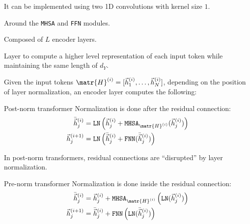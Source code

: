 \begin{description}
\begin{description}
                \begin{remark}
                    It can be implemented using two 1D convolutions with kernel size $1$.
                \end{remark}

            \item[Residual connection] 
                Around the \texttt{MHSA} and \texttt{FFN} modules.
        \end{description}


    \item[Encoder stack] 
        Composed of $L$ encoder layers.

    \item[Encoder layer] 
        Layer to compute a higher level representation of each input token while maintaining the same length of $d_Y$. 
        
        Given the input tokens $\matr{H}^{(i)} = [ \vec{h}^{(i)}_1, \dots, \vec{h}^{(i)}_N ]$, depending on the position of layer normalization, an encoder layer computes the following:
        \begin{descriptionlist}
            \item[Post-norm transformer] Normalization is done after the residual connection:
                \[
                    \begin{split}
                        \bar{\vec{h}}^{(i)}_j &= \texttt{LN}\left( \vec{h}^{(i)}_j + \texttt{MHSA}_{\matr{H}^{(i)}}(\vec{h}^{(i)}_j) \right) \\
                        \vec{h}^{(i+1)}_j &= \texttt{LN}\left( \bar{\vec{h}}^{(i)}_j + \texttt{FNN}(\bar{\vec{h}}^{(i)}_j) \right) \\
                    \end{split}
                \]

                \begin{remark}
                    In post-norm transformers, residual connections are ``disrupted'' by layer normalization.
                \end{remark}

            \item[Pre-norm transformer] Normalization is done inside the residual connection:
                \[
                    \begin{split}
                        \bar{\vec{h}}^{(i)}_j &= \vec{h}^{(i)}_j + \texttt{MHSA}_{\matr{H}^{(i)}}\left( \texttt{LN}(\vec{h}^{(i)}_j) \right) \\
                        \vec{h}^{(i+1)}_j &= \bar{\vec{h}}^{(i)}_j + \texttt{FNN}\left( \texttt{LN}(\bar{\vec{h}}^{(i)}_j) \right) \\
                    \end{split}
                \]


\end{descriptionlist}
\end{description}

